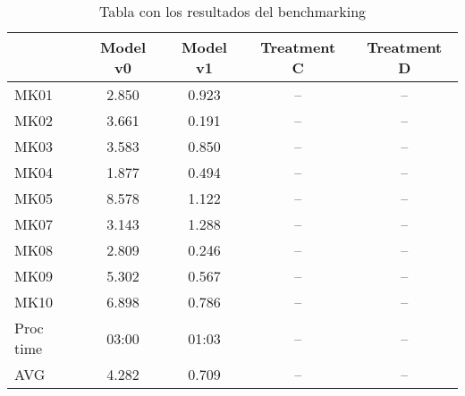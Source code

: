     \begin{table}[ht]
        \centering
        \begin{tabular}[t]{lcccc}
            \hline
            & Model v0 & Model v1 & Treatment C & Treatment D \\
            \hline
            MK01  & 2.850 & 0.923 & -- & -- \\
            MK02  & 3.661 & 0.191 & -- & -- \\
            MK03  & 3.583 & 0.850 & -- & -- \\
            MK04  & 1.877 & 0.494 & -- & -- \\
            MK05  & 8.578 & 1.122 & -- & -- \\
            MK07  & 3.143 & 1.288 & -- & -- \\
            MK08  & 2.809 & 0.246 & -- & -- \\
            MK09  & 5.302 & 0.567 & -- & -- \\
            MK10  & 6.898 & 0.786 & -- & -- \\
            \hline
            Proc time & 03:00 & 01:03 & -- & --  \\
            AVG   & 4.282 & 0.709 & -- & -- \\
            \hline
        \end{tabular}
        \caption{Tabla con los resultados del benchmarking}
    \end{table}


\pagebreak
